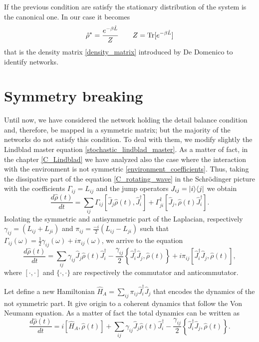 If the previous condition are satisfy the stationary distribution of the system is the canonical one. In our case it becomes
\begin{equation}
    \hat\rho^* = \frac{e^{-\beta\hat L}}{Z} \qquad Z = \operatorname{Tr}[e^{-\beta\hat L}]  
\end{equation}
that is the density matrix \eqref{density_matrix} introduced by De Domenico to identify networks.

\newpage
\section{Symmetry breaking}

Until now, we have considered the network holding the detail balance condition and, therefore, be mapped in a symmetric matrix; 
but the majority of the networks do not satisfy this condition. To deal with them, we modify slightly the Lindblad master equation \eqref{stochastic_lindblad_master}. 
As a matter of fact, in the chapter \ref{C_Lindblad} we have analyzed also the case where the interaction with the environment is not symmetric \eqref{environment_coefficients}. Thus, taking the dissipative part of the equation \eqref{C_rotating_wave} in the Schrödinger picture with the coefficients $\Gamma_{ij} = L_{ij}$ and the jump operators $J_{ij} = \lvert i\rangle\langle j\rvert$ we obtain 
\begin{equation}
    \frac{d\hat\rho(t)}{dt} = \sum_{ij}\Gamma_{ij}\left[\hat J_j\hat\rho(t),\hat J_i^\dagger\right]+\Gamma_{ji}^\dagger\left[\hat J_j,\hat\rho(t)\hat J_i^\dagger\right].
\end{equation}
Isolating the symmetric and antisymmetric part of the Laplacian, respectively $\gamma_{ij} = \left(L_{ij} + L_{ji}\right)$ and $\pi_{ij} =  \frac{-i}{2}\left(L_{ij}-L_{ji}\right)$ such that $\Gamma_{ij}(\omega) =\frac{1}{2}\gamma_{ij}(\omega)+i\pi_{ij}(\omega)$, we arrive to the equation
\begin{equation}
    \frac{d\hat\rho(t)}{dt} = \sum_{ij}\gamma_{ij}\hat J_j\hat\rho(t)\hat J_i^\dagger -\frac{\gamma_{ij}}{2}\left\{\hat J_i^\dagger\hat J_j,\hat\rho(t)\right\} + i\pi_{ij}\left[\hat J_i^\dagger\hat J_j,\hat\rho(t)\right],
\end{equation}
where $[\cdot,\cdot]$ and $\{\cdot,\cdot\}$ are respectively the commutator and anticommutator.

Let define a new Hamiltonian $\hat H_{A} = \sum_{ij}\pi_{ij}\hat J_i^\dagger\hat J_j$ that encodes the dynamics of the not symmetric part. 
It give origin to a coherent dynamics that follow the Von Neumann equation. As a matter of fact the total dynamics can be written as
\begin{equation}\label{antisymmetric_master_equation}
    \frac{d\hat\rho(t)}{dt} = i\left[\hat H_{A},\hat\rho(t)\right] + \sum_{ij}\gamma_{ij}\hat J_j\hat\rho(t)\hat J_i^\dagger -\frac{\gamma_{ij}}{2}\left\{\hat J_i^\dagger\hat J_j,\hat\rho(t)\right\}.
\end{equation}

